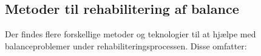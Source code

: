 \subsection{Metoder til rehabilitering af balance}

Der findes flere forskellige metoder og teknologier til at hjælpe med balanceproblemer  under rehabiliteringsprocessen. Disse omfatter: \cite{Sundhedsstyrelsen2011a}  

